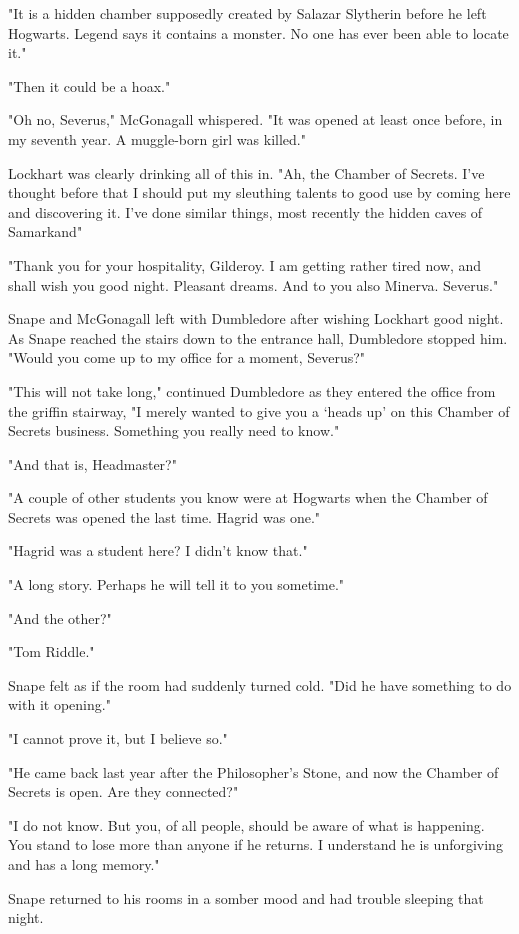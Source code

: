 "It is a hidden chamber supposedly created by Salazar Slytherin before he left Hogwarts. Legend says it contains a monster. No one has ever been able to locate it."

"Then it could be a hoax."

"Oh no, Severus," McGonagall whispered. "It was opened at least once before, in my seventh year. A muggle-born girl was killed."

Lockhart was clearly drinking all of this in. "Ah, the Chamber of Secrets. I've thought before that I should put my sleuthing talents to good use by coming here and discovering it. I've done similar things, most recently the hidden caves of Samarkand{\el}"

"Thank you for your hospitality, Gilderoy. I am getting rather tired now, and shall wish you good night. Pleasant dreams. And to you also Minerva. Severus."

Snape and McGonagall left with Dumbledore after wishing Lockhart good night. As Snape reached the stairs down to the entrance hall, Dumbledore stopped him. "Would you come up to my office for a moment, Severus?"

"This will not take long," continued Dumbledore as they entered the office from the griffin stairway, "I merely wanted to give you a `heads up' on this Chamber of Secrets business. Something you really need to know."

"And that is{\el}, Headmaster?"

"A couple of other students you know were at Hogwarts when the Chamber of Secrets was opened the last time. Hagrid was one."

"Hagrid was a student here? I didn't know that."

"A long story. Perhaps he will tell it to you sometime."

"And the other?"

"Tom Riddle."

Snape felt as if the room had suddenly turned cold. "Did he have something to do with it opening."

"I cannot prove it, but I believe so."

"He came back last year after the Philosopher's Stone, and now the Chamber of Secrets is open. Are they connected?"

"I do not know. But you, of all people, should be aware of what is happening. You stand to lose more than anyone if he returns. I understand he is unforgiving and has a long memory."

Snape returned to his rooms in a somber mood and had trouble sleeping that night.

